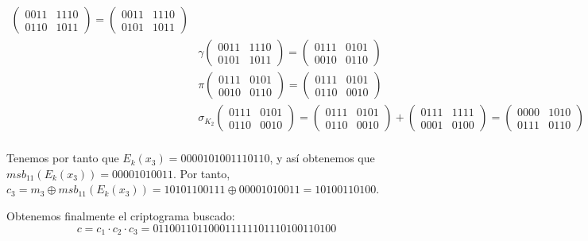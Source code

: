 \documentclass[fleqn]{article}
\begin{document}
\begin{equation*}
\begin{aligned}
            \begin{pmatrix}
                0011 & 1110 \\
                0110 & 1011
            \end{pmatrix} =
            \begin{pmatrix}
                0011 & 1110 \\
                0101 & 1011
            \end{pmatrix} \\
            &\gamma \begin{pmatrix}
                0011 & 1110 \\
                0101 & 1011
            \end{pmatrix} =
            \begin{pmatrix}
                0111 & 0101 \\
                0010 & 0110
            \end{pmatrix} \\
            &\pi \begin{pmatrix}
                0111 & 0101 \\
                0010 & 0110
            \end{pmatrix} =
            \begin{pmatrix}
                0111 & 0101 \\
                0110 & 0010
            \end{pmatrix} \\
            &\sigma_{K_2} \begin{pmatrix}
                0111 & 0101 \\
                0110 & 0010
            \end{pmatrix} =
            \begin{pmatrix}
                0111 & 0101 \\
                0110 & 0010
            \end{pmatrix} +
            \begin{pmatrix}
                0111 & 1111 \\
                0001 & 0100
            \end{pmatrix} =
            \begin{pmatrix}
                0000 & 1010 \\
                0111 & 0110
            \end{pmatrix} \\
        \end{aligned}
    \end{equation*}

    Tenemos por tanto que $E_k(x_3) = 0000101001110110$, y así obtenemos que $msb_{11}(E_k(x_3)) = 00001010011$. Por tanto,
    $c_3 = m_3 \oplus msb_{11}(E_k(x_3)) = 10101100111 \oplus 00001010011 = 10100110100$.

    Obtenemos finalmente el criptograma buscado:
    $$c = c_1 \cdot c_2 \cdot c_3 = 011001101100011111101110100110100$$
\end{document}
